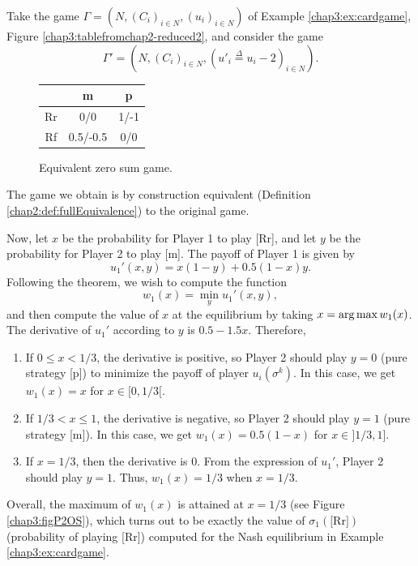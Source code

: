 \begin{example}
Take the game $\Gamma = (N, (C_i)_{i \in N}, (u_i)_{i \in N})$ of
 Example \ref{chap3:ex:cardgame}, Figure \ref{chap3:tablefromchap2-reduced2},
 and consider the game $$\Gamma' = (N, (C_i)_{i \in N}, (u'_i \overset{\Delta}{ =} u_i-2)_{i \in N}).$$

\begin{figure}[!ht]
\centering
\begin{tabular}{c|cc}
 & m & p \\
\hline
Rr & 0/0 & 1/-1 \\
Rf & 0.5/-0.5 & 0/0
\end{tabular}
\caption{Equivalent zero sum game. }
\label{chap3:tablefromchap2-eq0sum}
\end{figure}
The game we obtain is by construction equivalent (Definition \ref{chap2:def:fullEquivalence}) to the original game.

Now, let $x$ be the probability for Player 1 to play [Rr], and let $y$  be the probability for Player 2 to play [m].  The payoff of Player 1 is given by
$$u_1'(x,y) = x(1-y) + 0.5 (1-x)y. $$
Following the theorem, we wish to compute the function
$$ w_1(x) = \min_{y} u_1'(x,y),$$
and then compute the value of $x$ at the equilibrium by taking $x = \operatorname*{arg\,max} w_1(x)$.
The derivative of $u_1'$ according to $y$ is $0.5 - 1.5 x$. Therefore,
\begin{enumerate}
\item If $0 \leq x < 1/3$, the derivative is positive, so Player 2 should play $y = 0$ (pure strategy [p]) to minimize the payoff of player $u_i(\sigma^k)$.
In this case, we get $w_1(x) = x$ for $x \in [0, 1/3[$.
\item If $1/3 < x \leq 1$, the derivative is negative, so Player 2 should play $y = 1$ (pure strategy [m]).
In this case, we get $w_1(x) = 0.5(1-x)$ for $x \in ]1/3, 1]$.
\item If $x = 1/3$, then the derivative is 0. From the expression of $u_1'$, Player 2 should play $y = 1$. Thus, $w_1(x) = 1/3$ when $x = 1/3$.
\end{enumerate}

Overall, the maximum of $w_1(x)$ is attained at $x = 1/3$ (see Figure \ref{chap3:figP2OS}),  which turns out to be exactly the value of $\sigma_1(\text{[Rr]})$ (probability of playing [Rr]) computed for the Nash equilibrium in Example \ref{chap3:ex:cardgame}.




\end{example}
